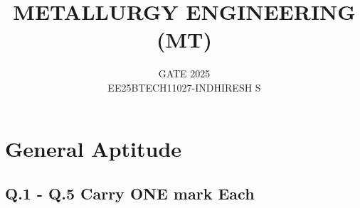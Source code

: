 \documentclass[journal]{IEEEtran}
\theoremstyle{remark}
\begin{document}

\onecolumn

\title{METALLURGY ENGINEERING (MT)}
\author{GATE 2025 \\
EE25BTECH11027-INDHIRESH S}
\maketitle

\renewcommand{\thefigure}{\theenumi}
\renewcommand{\thetable}{\theenumi}

\section*{General Aptitude}
\subsection*{Q.1 - Q.5 Carry ONE mark Each}
\end{document}
